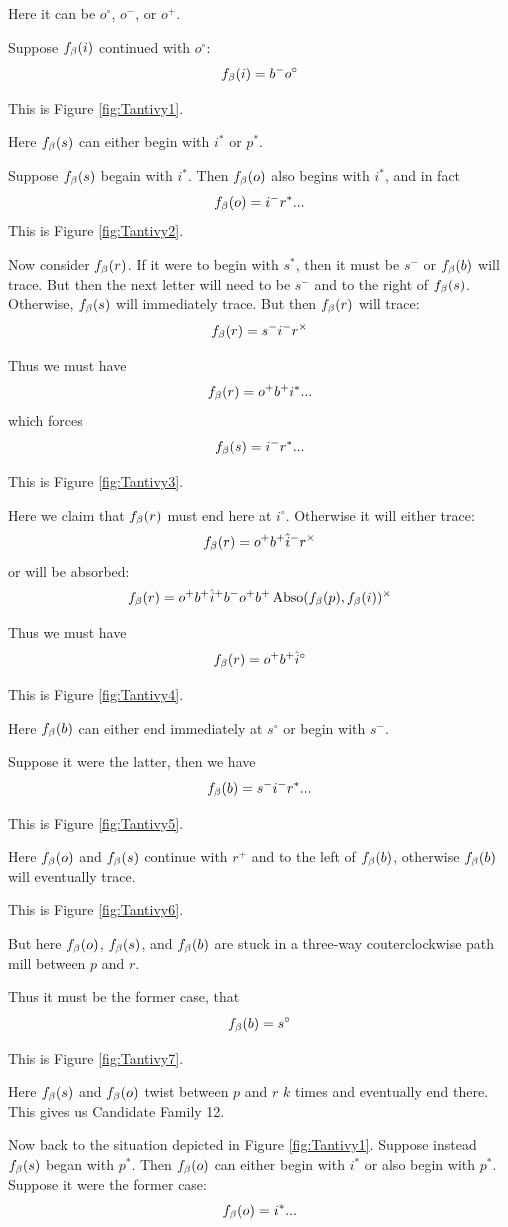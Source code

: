 Here it can be $o^\circ$, $o^-$, or $o^+$.

\label{Tantivy}
Suppose $f_\beta(i)$ continued with $o^\circ$:
$$f_\beta(i)  = b^- o^\circ$$

This is Figure \ref{fig:Tantivy1}.

Here $f_\beta(s)$ can either begin with $i^*$ or $p^*$.

Suppose $f_\beta(s)$ begain with $i^*$. Then $f_\beta(o)$ also begins with $i^*$, and in fact
$$f_\beta(o) = i^- r^*...$$
This is Figure \ref{fig:Tantivy2}.

Now consider $f_\beta(r)$. If it were to begin with $s^*$, then it must be $s^-$ or $f_\beta(b)$ will trace. But then the next letter will need to be $s^-$ and to the right of $f_\beta(s)$. Otherwise, $f_\beta(s)$ will immediately trace. But then $f_\beta(r)$ will trace:
$$f_\beta(r) = s^- i^- r^\times$$

Thus we must have
$$f_\beta(r) = o^+ b^+ i^*...$$
which forces 
$$f_\beta(s) = i^- r^*...$$

This is Figure \ref{fig:Tantivy3}.

Here we claim that $f_\beta(r)$ must end here at $i^\circ$. Otherwise it will either trace:
$$f_\beta(r) = o^+ b^+ \hat{i}^- r^\times$$
or will be absorbed:
$$f_\beta(r) = o^+ b^+ \hat{i}^+ b^- o^+ b^+ \operatorname{Abso}(f_\beta(p), f_\beta(i))^\times$$

Thus we must have
$$f_\beta(r) = o^+ b^+ \hat{i}^\circ$$

This is Figure \ref{fig:Tantivy4}.

Here $f_\beta(b)$ can either end immediately at $s^\circ$ or begin with $s^-$.

Suppose it were the latter, then we have
$$f_\beta(b) = s^- i^- r^*...$$

This is Figure \ref{fig:Tantivy5}.

Here $f_\beta(o)$ and $f_\beta(s)$ continue with $r^+$ and to the left of $f_\beta(b)$, otherwise $f_\beta(b)$ will eventually trace. 

This is Figure \ref{fig:Tantivy6}. 

But here $f_\beta(o)$, $f_\beta(s)$, and $f_\beta(b)$ are stuck in a three-way couterclockwise path mill between $p$ and $r$.

Thus it must be the former case, that
$$f_\beta(b) = s^\circ$$

This is Figure \ref{fig:Tantivy7}.

Here $f_\beta(s)$ and $f_\beta(o)$ twist between $p$ and $r$ $k$ times and eventually end there. This gives us Candidate Family 12.

Now back to the situation depicted in Figure \ref{fig:Tantivy1}. Suppose instead $f_\beta(s)$ began with $p^*$. Then $f_\beta(o)$ can either begin with $i^*$ or also begin with $p^*$. Suppose it were the former case:
$$f_\beta(o) = i^*...$$

